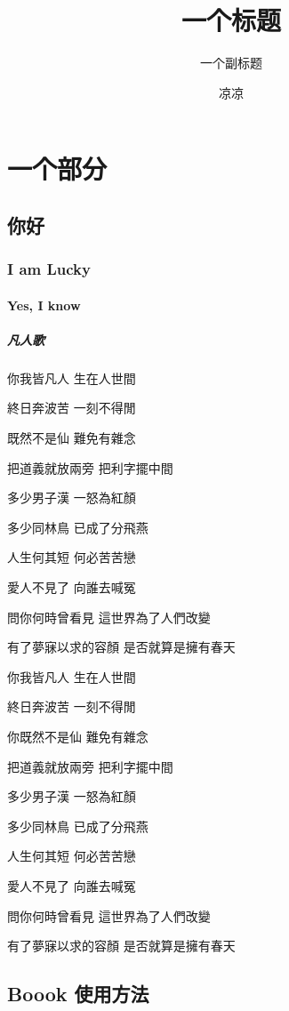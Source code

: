 \documentclass[geomode=digital, code=minted]{boook}
\title{一个标题}
\subtitle{一个副标题}
\author{凉凉}
\begin{document}
\maketitle
\tableofcontents

\part{一个部分}
\chapter{你好}
\section{I am Lucky}
\subsection{Yes, I know}
\subsubsection{凡人歌}
你我皆凡人 生在人世間

終日奔波苦 一刻不得閒

既然不是仙 難免有雜念

把道義就放兩旁 把利字擺中間

多少男子漢 一怒為紅顏

多少同林鳥 已成了分飛燕

人生何其短 何必苦苦戀

愛人不見了 向誰去喊冤

問你何時曾看見 這世界為了人們改變

有了夢寐以求的容顏 是否就算是擁有春天

你我皆凡人 生在人世間

終日奔波苦 一刻不得閒

你既然不是仙 難免有雜念

把道義就放兩旁 把利字擺中間

多少男子漢 一怒為紅顏

多少同林鳥 已成了分飛燕

人生何其短 何必苦苦戀

愛人不見了 向誰去喊冤

問你何時曾看見 這世界為了人們改變

有了夢寐以求的容顏 是否就算是擁有春天

\appendix

\chapter{Boook 使用方法}
\end{document}

